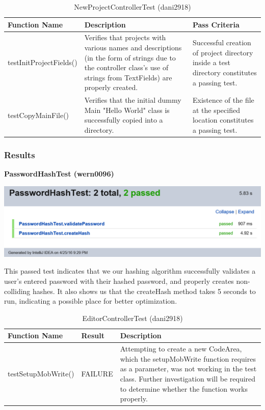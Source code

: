 \documentclass[twoside,letterpaper]{article}
\begin{document}
\begin{table}[h]
	\centering
	\caption{NewProjectControllerTest (dani2918)}
	\begin{tabular}{|p{3cm}|p{6cm}|p{6cm}|}
		\hline
		\textbf{Function Name} & \textbf{Description} & \textbf{Pass Criteria}  \\\hline
		testInitProjectFields() & Verifies that projects with various names and descriptions (in the form of strings due to the controller class's use of strings from TextFields) are properly created. & Successful creation of project directory inside a test directory constitutes a passing test.
		\\\hline
		testCopyMainFile() & Verifies that the initial dummy Main "Hello World" class is successfully copied into a directory. & Existence of the file at the specified location constitutes a passing test.
		\\\hline
	\end{tabular}
\end{table}

\newpage

\subsubsection{Results}

\textbf{PasswordHashTest (wern0096)} \newline

\includegraphics[width=\textwidth]{images/TestPlan/PasswordHashTest} \newline

This passed test indicates that we our hashing algorithm successfully validates a user's entered password with their hashed password, and properly creates non-colliding hashes. It also shows us that the createHash method takes 5 seconds to run, indicating a possible place for better optimization.

\begin{table}[h]
	\centering
	\caption{EditorControllerTest (dani2918)}
	\begin{tabular}{|p{3cm}|p{3cm}|p{9cm}|}
		\hline
		\textbf{Function Name} & \textbf{Result} & \textbf{Description}  \\\hline
		testSetupMobWrite() & FAILURE & Attempting to create a new CodeArea, which the setupMobWrite function requires as a parameter, was not working in the test class. Further investigation will be required to determine whether the function works properly.
		\\\hline
	\end{tabular}
\end{table}
\end{document}

